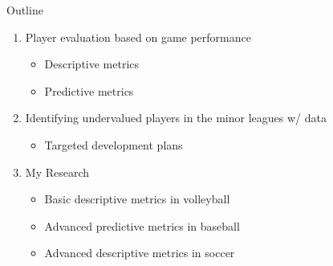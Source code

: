 \documentclass{beamer}
\begin{document}
\begin{frame}{Outline}
  \begin{enumerate}
    \item {\color{gray} Player evaluation based on game performance}
    \begin{itemize}
      \color{gray}
      \item Descriptive metrics
      \item Predictive metrics
    \end{itemize}
    \item {\color{gray} Identifying undervalued players in the minor leagues w/ data}
    \begin{itemize}
      \color{gray}
      \item Targeted development plans
    \end{itemize}
    \item My Research
    \begin{itemize}
      \item Basic descriptive metrics in volleyball
      \item Advanced predictive metrics in baseball
      \item Advanced descriptive metrics in soccer
    \end{itemize}
  \end{enumerate}
\end{frame}
\end{document}
